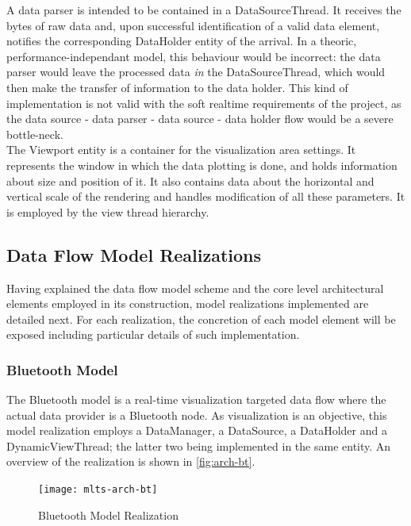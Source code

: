 		A data parser is intended to be contained in a DataSourceThread. It receives the bytes of raw data and, upon successful identification of a valid data element, notifies the corresponding DataHolder entity of the arrival. In a theoric, performance-independant model, this behaviour would be incorrect: the data parser would leave the processed data \emph{in} the DataSourceThread, which would then make the transfer of information to the data holder. This kind of implementation is not valid with the soft realtime requirements of the project, as the data source - data parser - data source - data holder flow would be a severe bottle-neck.\\

		The Viewport entity is a container for the visualization area settings. It represents the window in which the data plotting is done, and holds information about size and position of it. It also contains data about the horizontal and vertical scale of the rendering and handles modification of all these parameters. It is employed by the view thread hierarchy.
		
		\subsection{Data Flow Model Realizations}

		Having explained the data flow model scheme and the core level architectural elements employed in its construction, model realizations implemented are detailed next. For each realization, the concretion of each model element will be exposed including particular details of such implementation.

		\subsubsection{Bluetooth Model}
			The Bluetooth  model is a real-time visualization targeted data flow where the actual data provider is a Bluetooth node. As visualization is an objective, this model realization employs a DataManager, a DataSource, a DataHolder and a DynamicViewThread; the latter two being implemented in the same entity. An overview of the realization is shown in \autoref{fig:arch-bt}.\\

			\begin{figure}[h]
			\centering
		    	\texttt{[image: mlts-arch-bt]}
	  		\caption{Bluetooth Model Realization}
			\label{fig:arch-bt}
			\end{figure}

